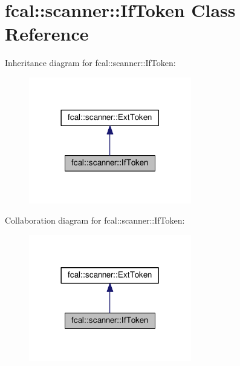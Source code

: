 \hypertarget{classfcal_1_1scanner_1_1IfToken}{}\section{fcal\+:\+:scanner\+:\+:If\+Token Class Reference}
\label{classfcal_1_1scanner_1_1IfToken}


Inheritance diagram for fcal\+:\+:scanner\+:\+:If\+Token\+:
\nopagebreak
\begin{figure}[H]
\begin{center}
\leavevmode
\includegraphics[width=201pt]{classfcal_1_1scanner_1_1IfToken__inherit__graph}
\end{center}
\end{figure}


Collaboration diagram for fcal\+:\+:scanner\+:\+:If\+Token\+:
\nopagebreak
\begin{figure}[H]
\begin{center}
\leavevmode
\includegraphics[width=201pt]{classfcal_1_1scanner_1_1IfToken__coll__graph}
\end{center}
\end{figure}

